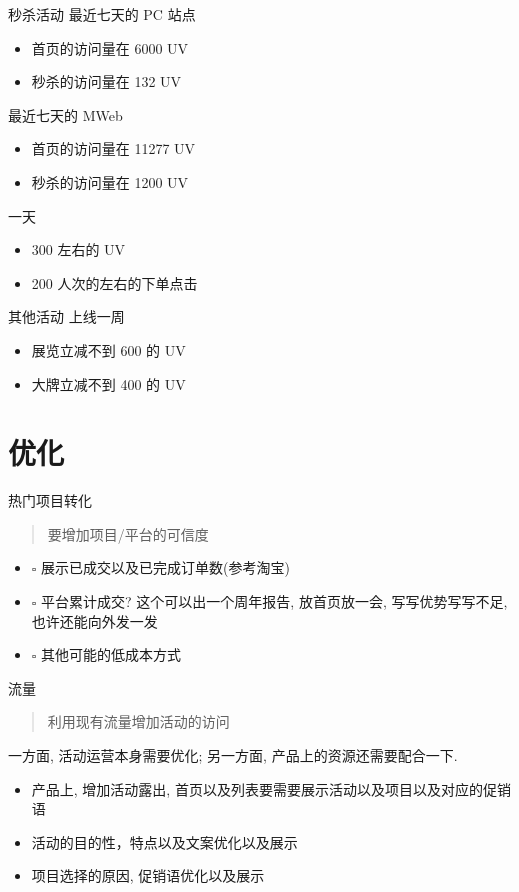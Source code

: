 \documentclass[presentation,bigger]{beamer}
\begin{document}
\begin{frame}[label={sec:orgheadline4}]{秒杀活动}
最近七天的 PC 站点
\begin{itemize}
\item 首页的访问量在 6000 UV
\item 秒杀的访问量在 132 UV
\end{itemize}

最近七天的 MWeb
\begin{itemize}
\item 首页的访问量在 11277 UV
\item 秒杀的访问量在 1200 UV
\end{itemize}

一天
\begin{itemize}
\item 300 左右的 UV
\item 200 人次的左右的下单点击
\end{itemize}
\end{frame}

\begin{frame}[label={sec:orgheadline5}]{其他活动}
上线一周
\begin{itemize}
\item 展览立减不到 600 的 UV
\item 大牌立减不到 400 的 UV
\end{itemize}
\end{frame}

\section{优化}
\label{sec:orgheadline11}
\begin{frame}[label={sec:orgheadline7}]{热门项目转化}
\begin{quote}
要增加项目/平台的可信度
\end{quote}
\begin{itemize}
\item $\square$ 展示已成交以及已完成订单数(参考淘宝)
\item $\square$ 平台累计成交? 这个可以出一个周年报告, 放首页放一会, 写写优势写写不足, 也许还能向外发一发
\item $\square$ 其他可能的低成本方式
\end{itemize}
\end{frame}

\begin{frame}[label={sec:orgheadline8}]{流量}
\begin{quote}
利用现有流量增加活动的访问
\end{quote}
一方面, 活动运营本身需要优化; 另一方面, 产品上的资源还需要配合一下.
\begin{itemize}
\item 产品上, 增加活动露出, 首页以及列表要需要展示活动以及项目以及对应的促销语
\item 活动的目的性，特点以及文案优化以及展示
\item 项目选择的原因, 促销语优化以及展示
\end{itemize}
\end{frame}
\end{document}
